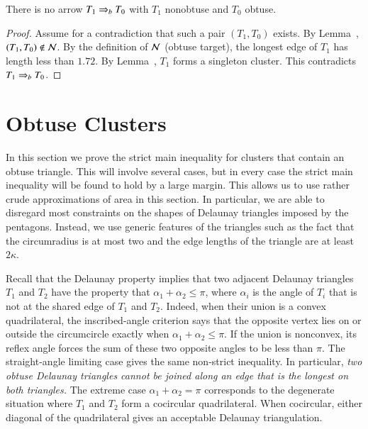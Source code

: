 \begin{lemma} 
  There is no arrow $T_1 \Rightarrow_{b} T_0$ with $T_1$ nonobtuse and $T_0$
  obtuse.
\end{lemma}

\begin{proof}  
  Assume for a contradiction that such a pair $(T_1,T_0)$ exists.  By
  Lemma~, $(T_1,T_0)\not\in\mathcal N$.  By the definition of
  $\mathcal N$ (obtuse target), the longest edge of $T_1$ has length less than
  $1.72$.  By Lemma~, $T_1$ forms a singleton
  cluster.  This contradicts $T_1\Rightarrow_{b} T_0$.
\end{proof}

\section{Obtuse Clusters}

In this section we prove the strict main inequality for clusters that
contain an obtuse triangle.  This will involve several cases, but in
every case the strict main inequality will be found to hold by a large
margin.  This allows us to use rather crude approximations of
area in this section.  In particular, we are able to disregard most
constraints on the shapes of Delaunay triangles imposed by the
pentagons.  Instead, we use generic features of the triangles such as
the fact that the circumradius is at most two and the edge lengths of
the triangle are at least $2\kappa$.

\begin{remark}
  Recall that the Delaunay property implies that two adjacent Delaunay
  triangles $T_1$ and $T_2$ have the property that $\alpha_1 +
  \alpha_2\le \pi$, where $\alpha_i$ is the angle of $T_i$ that is not
  at the shared edge of $T_1$ and $T_2$.  Indeed, when their union
  is a convex quadrilateral, the inscribed-angle criterion says that
  the opposite vertex lies on or outside the circumcircle exactly
  when $\alpha_1+\alpha_2\le\pi$.  If the union is nonconvex,
  its reflex angle forces the sum of these two opposite angles to be
  less than $\pi$.  The straight-angle limiting case gives the same
  non-strict inequality.  In particular, {\it two
    obtuse Delaunay triangles cannot be joined along an edge that is
    the longest on both triangles.}  The extreme case
  $\alpha_1+\alpha_2=\pi$ corresponds to the degenerate situation
  where $T_1$ and $T_2$ form a cocircular quadrilateral. When
  cocircular, either diagonal of the quadrilateral gives an acceptable
  Delaunay triangulation.
\end{remark}


